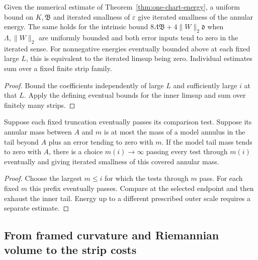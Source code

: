 \begin{lemma}
\label{lem:annular-bound-limits}
\leanok
Given the numerical estimate of Theorem~\ref{thm:one-chart-energy}, a
uniform bound on $K,\mathfrak B$ and iterated smallness of $\varepsilon$
give iterated smallness of the annular energy. The same holds for
the intrinsic bound $8\Lambda\mathfrak B+4\|W\|_2\mathfrak d$
when $\Lambda,\|W\|_2$ are uniformly bounded and both error inputs tend
to zero in the iterated sense. For nonnegative energies eventually
bounded above at each fixed large $L$, this is equivalent to the
iterated limsup being zero. Individual estimates sum over a fixed
finite strip family.
\end{lemma}
\begin{proof}
\leanok
Bound the coefficients independently of large $L$ and sufficiently
large $i$ at that $L$. Apply the defining eventual bounds for the
inner limsup and sum over finitely many strips.
\end{proof}

\begin{lemma}
\label{lem:diagonal-covered-end}
\leanok
Suppose each fixed truncation eventually passes its comparison test.
Suppose its annular mass between $A$ and $m$ is at most the mass of
a model annulus in the tail beyond $A$ plus an error tending to zero
with $m$. If the model tail mass tends to zero with $A$, there is
a choice $m(i)\to\infty$ passing every test through $m(i)$ eventually
and giving iterated smallness of this covered annular mass.
\end{lemma}
\begin{proof}
\leanok
Choose the largest $m\le i$ for which the tests through $m$ pass.
For each fixed $m$ this prefix eventually passes. Compare at the
selected endpoint and then exhaust the inner tail. Energy up to a
different prescribed outer scale requires a separate estimate.
\end{proof}

\subsection{From framed curvature and Riemannian volume to the strip costs}

